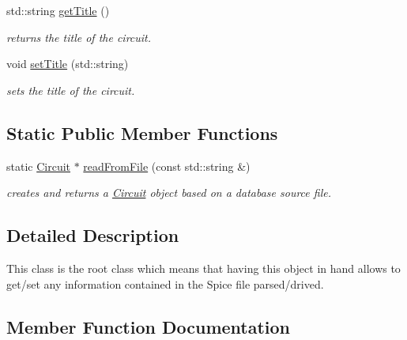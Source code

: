 \begin{DoxyCompactItemize}
std\+::string \mbox{\hyperlink{class_s_p_i_c_e_1_1_circuit_ad19721dd878c04c854a72af12d785741}{get\+Title}} ()
\begin{DoxyCompactList}\small\item\em returns the title of the circuit. \end{DoxyCompactList}\item 
void \mbox{\hyperlink{class_s_p_i_c_e_1_1_circuit_a798df9ebd558e22c85eeceb5202e3123}{set\+Title}} (std\+::string)
\begin{DoxyCompactList}\small\item\em sets the title of the circuit. \end{DoxyCompactList}\end{DoxyCompactItemize}
\subsection*{Static Public Member Functions}
\begin{DoxyCompactItemize}
\item 
static \mbox{\hyperlink{class_s_p_i_c_e_1_1_circuit}{Circuit}} $\ast$ \mbox{\hyperlink{class_s_p_i_c_e_1_1_circuit_aa8294fe7d9ceddb5653d08ecae3eaf36}{read\+From\+File}} (const std\+::string \&)
\begin{DoxyCompactList}\small\item\em creates and returns a \mbox{\hyperlink{class_s_p_i_c_e_1_1_circuit}{Circuit}} object based on a database source file. \end{DoxyCompactList}\end{DoxyCompactItemize}


\subsection{Detailed Description}
This class is the root class which means that having this object in hand allows to get/set any information contained in the Spice file parsed/drived. 

\subsection{Member Function Documentation}
\mbox{\label{class_s_p_i_c_e_1_1_circuit_a30fc53c4da54215fdec3ab1b96ea1943}} 
